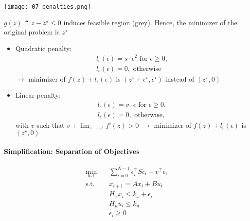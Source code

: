\begin{examplesection}
    \begin{center}
        \texttt{[image: 07\_penalties.png]}
    \end{center}

    $g(z) \triangleq z - z^\star \leq 0$ induces feasible region (grey). Hence, the minimizer of the original problem is $z^\star$

    \begin{itemize}
        \item Quadratic penalty:
              \begin{gather*}
                  l_\epsilon(\epsilon) = s \cdot \epsilon^2 \text{ for } \epsilon \geq 0,\\
                  l_\epsilon(\epsilon) = 0, \text{ otherwise}
              \end{gather*}
              $\rightarrow$ minimizer of $f(z) + l_\epsilon(\epsilon)$ is $(z^\star + \epsilon^\star, \epsilon^\star)$ instead of $(z^\star, 0)$
        \item Linear penalty:
              \begin{gather*}
                  l_\epsilon(\epsilon) = v \cdot \epsilon \text{ for }\epsilon \geq 0,\\
                  l_\epsilon(\epsilon) = 0, \text{ otherwise},
              \end{gather*}
              with $v$ such that $v + \lim_{z \to z^\star} f'(z) > 0$
              \newpar{}
              $\rightarrow$ minimizer of $f(z) + l_\epsilon(\epsilon)$ is $(z^\star, 0)$
    \end{itemize}
\end{examplesection}

\paragraph{Simplification: Separation of Objectives}
\begin{align*}
    \min_{u, \epsilon} \quad & \sum_{i=0}^{N-1} \epsilon_i^\top S \epsilon_i + v^\top \epsilon_i \\
    \text{s.t.} \quad        & x_{i+1} = A x_i + B u_i                                           \\
                             & H_x x_i \leq k_x + \epsilon_i                                     \\
                             & H_u u_i \leq k_u                                                  \\
                             & \epsilon_i \geq 0
\end{align*}
\newpar{}


